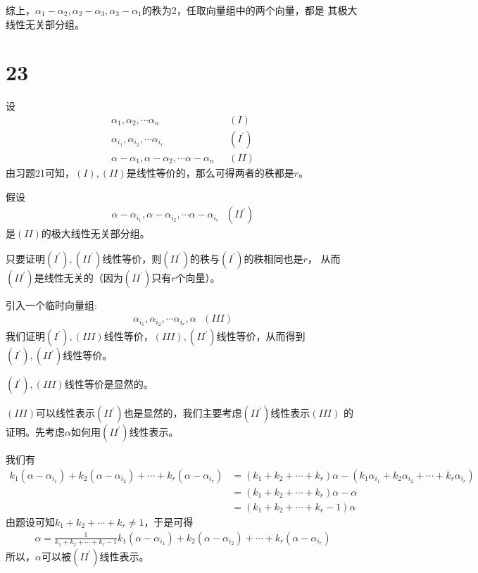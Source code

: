 \documentclass{article}
\begin{document}
综上，$\alpha_1 - \alpha_2, \alpha_2 - \alpha_3, \alpha_3 - \alpha_1$的秩为2，任取向量组中的两个向量，都是
其极大线性无关部分组。

\section*{23}

设
\begin{align*}
  \alpha_1, \alpha_2, \cdots \alpha_n                            & \ \ \ (I)        \\
  \alpha_{i_1}, \alpha_{i_2}, \cdots \alpha_{i_r}                & \ \ \ (I^\prime) \\
  \alpha - \alpha_1, \alpha - \alpha_2, \cdots \alpha - \alpha_n & \ \ \ (II)
\end{align*}
由习题21可知，$(I),(II)$是线性等价的，那么可得两者的秩都是$r$。

假设
\begin{align*}
  \alpha - \alpha_{i_1}, \alpha - \alpha_{i_2}, \cdots \alpha - \alpha_{i_r} \ \ \ (II^\prime)
\end{align*}
是$(II)$的极大线性无关部分组。

只要证明$(I^\prime), (II^\prime)$线性等价，则$(II^\prime)$的秩与$(I^\prime)$的秩相同也是$r$，
从而$(II^\prime)$是线性无关的（因为$(II^\prime)$只有$r$个向量）。

引入一个临时向量组:
\begin{align*}
  \alpha_{i_1}, \alpha_{i_2}, \cdots \alpha_{i_r}, \alpha \ \ \ (III)
\end{align*}
我们证明$(I^\prime), (III)$线性等价，$(III), (II^\prime)$线性等价，从而得到
$(I^\prime), (II^\prime)$线性等价。

$(I^\prime), (III)$线性等价是显然的。

$(III)$可以线性表示$(II^\prime)$也是显然的，我们主要考虑$(II^\prime)$线性表示$(III)$
的证明。先考虑$\alpha$如何用$(II^\prime)$线性表示。

我们有
\begin{align*}
  k_1 (\alpha - \alpha_{i_1}) + k_2 (\alpha - \alpha_{i_2}) + \cdots + k_r (\alpha - \alpha_{i_r})
   & = (k_1 + k_2 + \cdots + k_r)\alpha - (k_1\alpha_{i_1} + k_2\alpha_{i_2} + \cdots + k_r\alpha_{i_r}) \\
   & = (k_1 + k_2 + \cdots + k_r)\alpha - \alpha                                                         \\
   & = (k_1 + k_2 + \cdots + k_r - 1)\alpha
\end{align*}
由题设可知$k_1 + k_2 + \cdots + k_r \neq 1$，于是可得
\begin{align*}
  \alpha = \frac{1}{k_1 + k_2 + \cdots + k_r - 1} k_1 (\alpha - \alpha_{i_1}) + k_2 (\alpha - \alpha_{i_2}) + \cdots + k_r (\alpha - \alpha_{i_r})
\end{align*}
所以，$\alpha$可以被$(II^\prime)$线性表示。
\end{document}
